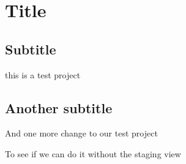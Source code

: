 \documentclass{article}
\begin{document}
\section{Title}

\subsection{Subtitle}

this is a test project

\subsection{Another subtitle}

And one more change to our test project

To see if we can do it without the staging view
\end{document}
